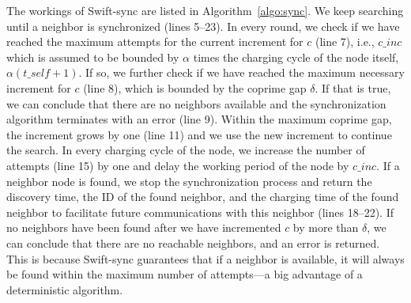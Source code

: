 \documentclass[lettersize,journal]{IEEEtran}
\newcommand{\MyComment}[1]{\State{\textcolor{gray}{// #1}}}
\newcommand{\ours}{Swift\xspace}
\newcommand{\sync}{Swift-sync\xspace}
\begin{document}
\begin{algorithm}[!t]
    \small
    \caption{Node synchronization mechanism \ours-sync}\label{algo:sync}
    \begin{algorithmic}[1]
    
        \MyComment{Maximum tries reached, step forward by one slot}
            \Else
            \EndIf
        \EndIf
        \MyComment{Coprime condition met, working period offsets matched}
        \EndIf
    \EndWhile
    \end{algorithmic}
\end{algorithm}

The workings of \sync are listed in Algorithm~\ref{algo:sync}. We keep searching until a neighbor is synchronized (lines 5--23). In every round, we check if we have reached the maximum attempts for the current increment for $c$ (line 7), i.e., $c\_inc$ which is assumed to be bounded by $\alpha$ times the charging cycle of the node itself, $\alpha (t\_{self} + 1)$.
If so, we further check if we have reached the maximum necessary increment for $c$ (line 8), which is bounded by the coprime gap $\delta$. If that is true, we can conclude that there are no neighbors available and the synchronization algorithm terminates with an error (line 9). Within the maximum coprime gap, the increment grows by one (line 11) and we use the new increment to continue the search. In every charging cycle of the node, we increase the number of attempts (line 15) by one and delay the working period of the node by $c\_inc$. If a neighbor node is found, we stop the synchronization process and return the discovery time, the ID of the found neighbor, and the charging time of the found neighbor to facilitate future communications with this neighbor (lines 18--22). If no neighbors have been found after we have incremented $c$ by more than $\delta$, we can conclude that there are no reachable neighbors, and an error is returned. This is because \ours-sync guarantees that if a neighbor is available, it will always be found within the maximum number of attempts---a big advantage of a deterministic algorithm.
\end{document}
